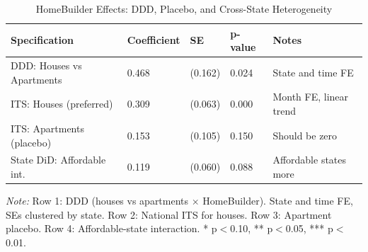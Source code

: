 \begin{table}[!h]
\centering
\caption{\label{tab:ddd}HomeBuilder Effects: DDD, Placebo, and Cross-State Heterogeneity}
\footnotesize
\begin{tabular}[t]{lllll}
\toprule
Specification & Coefficient & SE & p-value & Notes\\
\midrule
DDD: Houses vs Apartments & 0.468 & (0.162) & 0.024 & State and time FE\\
ITS: Houses (preferred) & 0.309 & (0.063) & 0.000 & Month FE, linear trend\\
ITS: Apartments (placebo) & 0.153 & (0.105) & 0.150 & Should be zero\\
State DiD: Affordable int. & 0.119 & (0.060) & 0.088 & Affordable states more\\
\bottomrule
\end{tabular}

\vspace{0.3em}
{\scriptsize \textit{Note:} Row 1: DDD (houses vs apartments $\times$ HomeBuilder). State and time FE, SEs clustered by state. Row 2: National ITS for houses. Row 3: Apartment placebo. Row 4: Affordable-state interaction. * p$<$0.10, ** p$<$0.05, *** p$<$0.01.}
\end{table}
